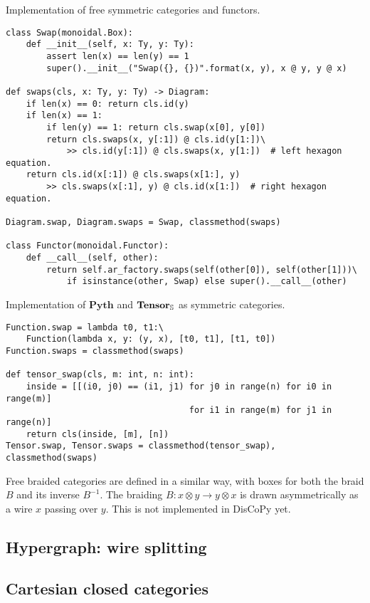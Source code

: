 \begin{python}
{\normalfont Implementation of free symmetric categories and functors.}

\begin{verbatim}
class Swap(monoidal.Box):
    def __init__(self, x: Ty, y: Ty):
        assert len(x) == len(y) == 1
        super().__init__("Swap({}, {})".format(x, y), x @ y, y @ x)

def swaps(cls, x: Ty, y: Ty) -> Diagram:
    if len(x) == 0: return cls.id(y)
    if len(x) == 1:
        if len(y) == 1: return cls.swap(x[0], y[0])
        return cls.swaps(x, y[:1]) @ cls.id(y[1:])\
            >> cls.id(y[:1]) @ cls.swaps(x, y[1:])  # left hexagon equation.
    return cls.id(x[:1]) @ cls.swaps(x[1:], y)
        >> cls.swaps(x[:1], y) @ cls.id(x[1:])  # right hexagon equation.

Diagram.swap, Diagram.swaps = Swap, classmethod(swaps)

class Functor(monoidal.Functor):
    def __call__(self, other):
        return self.ar_factory.swaps(self(other[0]), self(other[1]))\
            if isinstance(other, Swap) else super().__call__(other)
\end{verbatim}
\end{python}

\begin{python}
{\normalfont Implementation of $\mathbf{Pyth}$ and $\mathbf{Tensor}_\S$ as symmetric categories.}
\begin{verbatim}
Function.swap = lambda t0, t1:\
    Function(lambda x, y: (y, x), [t0, t1], [t1, t0])
Function.swaps = classmethod(swaps)

def tensor_swap(cls, m: int, n: int):
    inside = [[(i0, j0) == (i1, j1) for j0 in range(n) for i0 in range(m)]
                                    for i1 in range(m) for j1 in range(n)]
    return cls(inside, [m], [n])
Tensor.swap, Tensor.swaps = classmethod(tensor_swap), classmethod(swaps)
\end{verbatim}
\end{python}

Free braided categories are defined in a similar way, with boxes for both the braid $B$ and its inverse $B^{-1}$.
The braiding $B : x \otimes y \to y \otimes x$ is drawn asymmetrically as a wire $x$ passing over $y$.
This is not implemented in DisCoPy yet.

\cite{DelpeuchVicary21}

\subsection{Hypergraph: wire splitting} \label{subsection:hypergraph}

\subsection{Cartesian closed categories}
